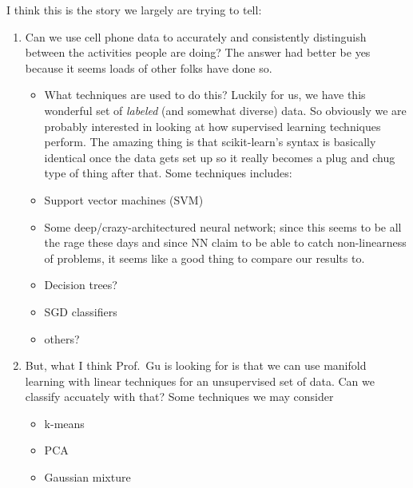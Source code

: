 I think this is the story we largely are trying to tell: 
\begin{enumerate}
	\item Can we use cell phone data to accurately and consistently distinguish between the activities people are doing? The answer had better be yes because it seems loads of other folks have done so.

		\begin{itemize}
	\item What techniques are used to do this? Luckily for us, we have this wonderful set of \emph{labeled} (and somewhat diverse) data. So obviously we are probably interested in looking at how supervised learning techniques perform. The amazing thing is that scikit-learn's syntax is basically identical once the data gets set up so it really becomes a plug and chug type of thing after that. Some techniques includes:
			\item Support vector machines (SVM)
			\item Some deep/crazy-architectured neural network; since this seems to be all the rage these days and since NN claim to be able to catch non-linearness of problems, it seems like a good thing to compare our results to.
			\item  Decision trees?
			\item SGD classifiers
			\item others?
		\end{itemize}

	\item But, what I think Prof.\ Gu is looking for is that we can use manifold learning with linear techniques for an unsupervised set of data. Can we classify accuately with that? Some techniques we may consider
		\begin{itemize}
			\item k-means
			\item PCA
			\item Gaussian mixture
		\end{itemize}

\end{enumerate}
